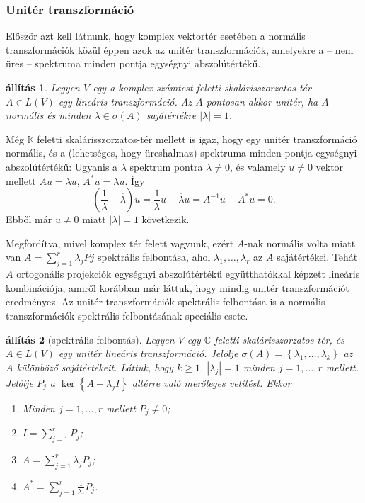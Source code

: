 \documentclass[a4paper, showtrims]{memoir}
\makeatletter
\renewenvironment{proof}[1][\proofname]
    {\par\pushQED{\qed}%
    \normalfont \topsep6\p@\@plus6\p@\relax
    \trivlist
    \item[\hskip\labelsep
        \itshape
    #1\@addpunct{:}]\ignorespaces}
    {\popQED\endtrivlist\@endpefalse}
\theoremstyle{plain}
\newtheorem{proposition}{állítás}[chapter]
\theoremstyle{remark}
\theoremstyle{definition}
\makeatother
\begin{document}
\subsubsection{Unitér transzformáció}
Először azt kell látnunk,
hogy komplex vektortér esetében a normális transzformációk közül éppen azok az unitér transzformációk,
amelyekre a -- nem üres -- spektruma minden pontja egységnyi abszolútértékű.
\begin{proposition}
	Legyen $V$ egy a komplex számtest feletti skalárisszorzatos-tér.
	$A\in L\left( V \right)$ egy lineáris transzformáció.
	Az $A$ pontosan akkor unitér, ha $A$ normális és minden $\lambda\in\sigma\left( A \right)$ sajátértékre
	$|\lambda|=1$.
\end{proposition}
\begin{proof}
	Még $\mathbb{K}$ feletti skalárisszorzatos-tér mellett is igaz,
	hogy egy unitér transzformáció normális,
	és a (lehetséges, hogy üreshalmaz) spektruma minden pontja egységnyi abszolútértékű:
	Ugyanis a $\lambda$ spektrum pontra $\lambda\neq 0$,
	és valamely $u\neq 0$ vektor mellett
	$Au=\lambda u$, $A^\ast u=\overline{\lambda}u$. Így
	\[
		\left( \frac{1}{\lambda}-\overline{\lambda} \right)u
		=
		\frac{1}{\lambda}u-\overline{\lambda}u
		=
		A^{-1}u-A^\ast u
		=0.
	\]
	Ebből már
	$u\neq 0$ miatt $|\lambda|=1$ következik.

	Megfordítva,
	mivel komplex tér felett vagyunk,
	ezért $A$-nak normális volta miatt van
	$A=\sum_{j=1}^r\lambda_jPj$ spektrális felbontása,
	ahol $\lambda_1,\ldots,\lambda_r$ az $A$ sajátértékei.
	Tehát $A$ ortogonális projekciók egységnyi abszolútértékű együtthatókkal képzett lineáris kombinációja,
	amiről korábban már láttuk, hogy mindig unitér transzformációt eredményez.
\end{proof}
Az unitér transzformációk spektrális felbontása is
a normális transzformációk spektrális felbontásának speciális esete.
\begin{proposition}[spektrális felbontás]
	Legyen $V$ egy $\mathbb{C}$ feletti skalárisszorzatos-tér, és $A\in L\left( V \right)$
	egy unitér lineáris transzformáció.
	Jelölje $\sigma\left( A \right)=\left\{\lambda_1,\ldots,\lambda_k  \right\}$ az $A$ különböző sajátértékeit.
	Láttuk, hogy $k\geq 1$, $|\lambda_j|=1$ minden $j=1,\ldots,r$ mellett.
	Jelölje $P_j$ a $\ker\left\{ A-\lambda_jI \right\}$ altérre való merőleges vetítést.
	Ekkor
	\begin{enumerate}
		\item Minden $j=1,\ldots,r$ mellett $P_j\neq 0$;
		\item $I=\sum_{j=1}^rP_j$;
		\item $A=\sum_{j=1}^r\lambda_jP_j$;
		\item $A^\ast=\sum_{j=1}^r\frac{1}{\lambda_j}P_j$.
		      \qedhere
	\end{enumerate}
\end{proposition}
\end{document}
